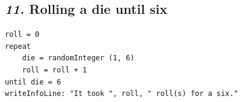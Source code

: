 \documentclass[12pt, english]{article}
\begin{document}
\subsection*{\emph{11.} Rolling a die until six}

\begin{lstlisting}[rulesepcolor=\color{blue}]
roll = 0
repeat
	die = randomInteger (1, 6)
	roll = roll + 1
until die = 6
writeInfoLine: "It took ", roll, " roll(s) for a six."
\end{lstlisting}
\vspace{10pt}
\end{document}
